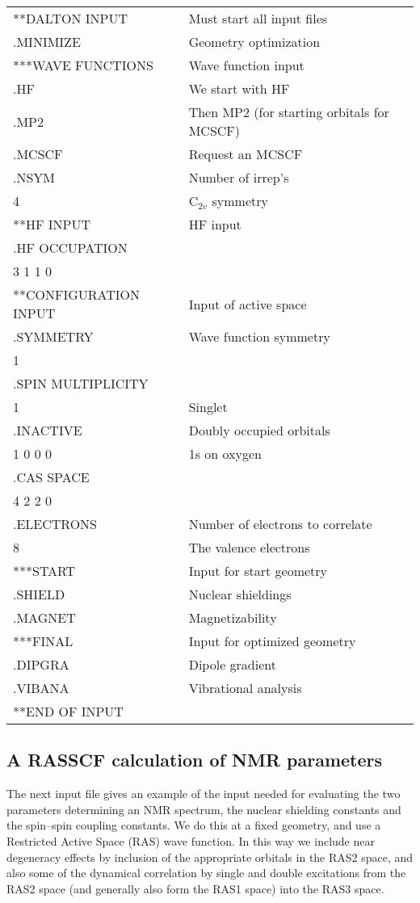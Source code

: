 {\ttfamily
\begin{tabular}{ll}
**DALTON INPUT\hspace{4cm} & Must start all input files\\
.MINIMIZE & Geometry optimization\\
***WAVE FUNCTIONS & Wave function input\\
.HF & We start with HF\\
.MP2 & Then MP2 (for starting orbitals for MCSCF)\\
.MCSCF & Request an MCSCF\\
.NSYM & Number of irrep's\\
 4 & C$_{2v}$ symmetry\\
**HF INPUT & HF input\\
.HF OCCUPATION\\
 3 1 1 0\\
**CONFIGURATION INPUT & Input of active space\\
.SYMMETRY & Wave function symmetry\\
 1\\
.SPIN MULTIPLICITY\\
 1 & Singlet\\
.INACTIVE & Doubly occupied orbitals\\
 1 0 0 0 & 1s on oxygen\\
.CAS SPACE\\
 4 2 2 0\\
.ELECTRONS & Number of electrons to correlate\\
 8 & The valence electrons\\
***START & Input for start geometry\\
.SHIELD & Nuclear shieldings\\
.MAGNET & Magnetizability\\
***FINAL & Input for optimized geometry\\
.DIPGRA & Dipole gradient\\
.VIBANA & Vibrational analysis\\
**END OF INPUT\\
\end{tabular}}

\subsection{A RASSCF calculation of NMR parameters}

The next input file gives an example of the input needed for
evaluating the two parameters determining an NMR spectrum, the nuclear
shielding constants and the spin--spin
coupling constants. We do this
at a fixed geometry, and use a Restricted Active Space (RAS) wave
function. In this way we include near degeneracy effects by inclusion 
of the appropriate orbitals in the RAS2 space, and also some of the
dynamical correlation  by single and
double excitations 
from the RAS2 space (and generally also form the RAS1 space) into the
RAS3 space.


